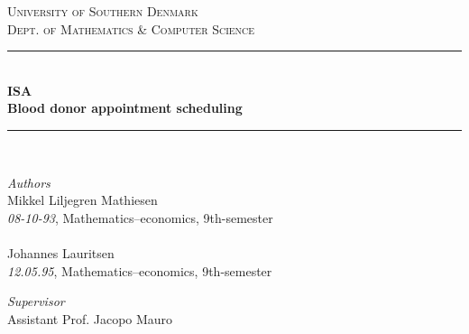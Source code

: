 \documentclass[a4paper,12pt]{article}
\begin{document}
	\begin{titlepage} %
		\newcommand{\HRule}{\rule{\linewidth}{0.5mm}} %
		
		\center %
		
		
		\textsc{\LARGE University of Southern Denmark}\\[0.5cm] %
		
		\textsc{\Large Dept. of Mathematics \& Computer Science
         }\\[0.5cm] %
		
		
		\HRule\\[0.6cm]
		
		{\huge\bfseries ISA \\ [0.4cm] Blood donor appointment scheduling
		}\\[0.4cm] %
		
		\HRule\\[2 cm]
		
		
	
		\begin{flushleft}
			\large
			\textit{Authors}\\
			Mikkel Liljegren Mathiesen\\
			\textit{08-10-93}, Mathematics–economics, 9th-semester\\
			\ \\
			Johannes Lauritsen\\
			\textit{12.05.95}, Mathematics–economics, 9th-semester
		\end{flushleft}
		
		\begin{flushleft}
			\large
			\textit{Supervisor}\\
			Assistant Prof. Jacopo Mauro
			

		\end{flushleft}


\end{titlepage}
\end{document}
